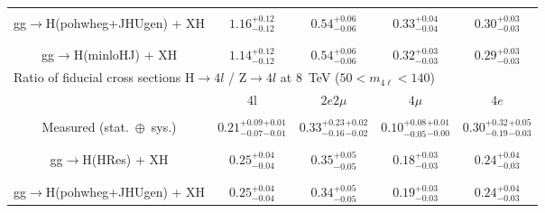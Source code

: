 \begin{table}[!h!tb]
\begin{center}
\begin{tabular}{|c|c|c|c|c|}
\\
\vspace{-0.4cm} &&&&\\
\hline %
\vspace{-0.4cm} &&&&\\
\small gg$\rightarrow$H({\sc pohwheg+JHUgen}) + XH
&$1.16^{+0.12}_{-0.12}$
&$0.54^{+0.06}_{-0.06}$
&$0.33^{+0.04}_{-0.04}$
&$0.30^{+0.03}_{-0.03}$
\\
\vspace{-0.4cm} &&&&\\
\hline %
\vspace{-0.4cm} &&&&\\
\small gg$\rightarrow$H({\sc minloHJ}) + XH
&$1.14^{+0.12}_{-0.12}$
&$0.54^{+0.06}_{-0.06}$
&$0.32^{+0.03}_{-0.03}$
&$0.29^{+0.03}_{-0.03}$
\\
\hline %
\hline %
\multicolumn{5}{|l|}{ Ratio of fiducial cross sections H$\rightarrow 4l$ / Z$\rightarrow 4l$ at 8~TeV  ($50 < m_{4\ell} < 140$)} \\
\hline
& 4l & $2e2\mu$ & $4\mu$ & $4e$ \\
\hline %
\vspace{-0.4cm} &&&&\\
Measured (stat.~$\oplus$~sys.)
& $0.21 {}^{+0.09}_{-0.07}  {}^{+0.01}_{-0.01} $  
& $0.33 {}^{+0.23}_{-0.16} {}^{+0.02}_{-0.02} $  
& $0.10 {}^{+0.08}_{-0.05} {}^{+0.01}_{-0.00} $  
& $0.30 {}^{+0.32}_{-0.19} {}^{+0.05}_{-0.03} $ 

\\
\vspace{-0.4cm} &&&&\\
\hline %
\vspace{-0.4cm} &&&&\\
\small gg$\rightarrow$H({\sc HRes}) + XH 
& $0.25^{+0.04}_{-0.04}$  & $0.35^{+0.05}_{-0.05}$  & $0.18^{+0.03}_{-0.03}$  & $0.24^{+0.04}_{-0.03}$  
\\
\vspace{-0.4cm} &&&&\\
\hline %
\vspace{-0.4cm} &&&&\\
\small gg$\rightarrow$H({\sc pohwheg+JHUgen}) + XH 
&$0.25^{+0.04}_{-0.04}$
&$0.34^{+0.05}_{-0.05}$
&$0.19^{+0.03}_{-0.03}$
&$0.24^{+0.04}_{-0.03}$


\end{tabular}
\end{center}
\end{table}
